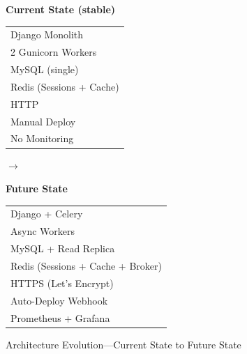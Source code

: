 \begin{figure}[htbp]
    \centering
    \begin{minipage}{0.45\textwidth}
        \centering
        \textbf{Current State (stable)}\\[0.5em]
        \begin{tabular}{|l|}
            \hline
            Django Monolith \\
            2 Gunicorn Workers \\
            MySQL (single) \\
            Redis (Sessions + Cache) \\
            HTTP \\
            Manual Deploy \\
            No Monitoring \\
            \hline
        \end{tabular}
    \end{minipage}
    \hfill
    $\rightarrow$
    \hfill
    \begin{minipage}{0.45\textwidth}
        \centering
        \textbf{Future State}\\[0.5em]
        \begin{tabular}{|l|}
            \hline
            Django + Celery \\
            Async Workers \\
            MySQL + Read Replica \\
            Redis (Sessions + Cache + Broker) \\
            HTTPS (Let's Encrypt) \\
            Auto-Deploy Webhook \\
            Prometheus + Grafana \\
            \hline
        \end{tabular}
    \end{minipage}
    \caption{Architecture Evolution---Current State to Future State}
    \label{fig:architecture-evolution}
\end{figure}

